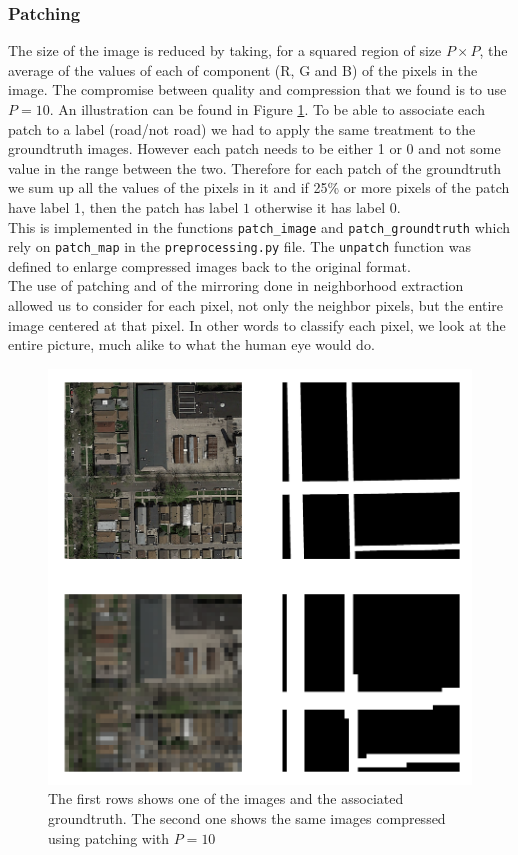 \documentclass[10pt,conference,compsocconf]{IEEEtran}
\begin{document}
\subsubsection{Patching}
The size of the image is reduced by taking, for a squared region of size $P\times P$, the average of the values of each of component (R, G and B) of the pixels in the image. The compromise between quality and compression that we found is to use $P=10$. An illustration can be found in Figure \ref{fig:patching}.
To be able to associate each patch to a label (road/not road) we had to apply the same treatment to the groundtruth images. However each patch needs to be either 1 or 0 and not some value in the range between the two. Therefore for each patch of the groundtruth we sum up all the values of the pixels in it and if 25\% or more pixels of the patch have label 1, then the patch has label $1$ otherwise it has label $0$.\\
This is implemented in the functions \texttt{patch\_image} and \texttt{patch\_groundtruth} which rely on \texttt{patch\_map} in the \texttt{preprocessing.py} file. The \texttt{unpatch} function was defined to enlarge compressed images back to the original format.\\
The use of patching and of the mirroring done in neighborhood extraction allowed us to consider for each pixel, not only the neighbor pixels, but the entire image centered at that pixel. In other words to classify each pixel, we look at the entire picture, much alike to what the human eye would do.
\begin{figure}[h]
  \centering
  \includegraphics[height=0.6\columnwidth]{patching.png}
  \caption{The first rows shows one of the images and the associated groundtruth. The second one shows the same images compressed using patching with $P=10$}
  \vspace{-3mm}
  \label{fig:patching}
\end{figure}
\end{document}
